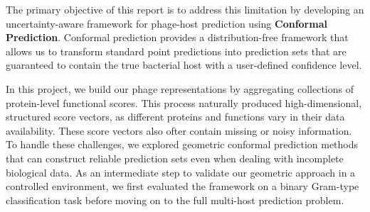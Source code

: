 The primary objective of this report is to address this limitation by developing an uncertainty-aware framework
for phage-host prediction using \textbf{Conformal Prediction}. Conformal prediction provides a
distribution-free framework that allows us to transform standard point predictions into prediction
sets that are guaranteed to contain the true bacterial host with a user-defined confidence level.

In this project, we build our phage representations by aggregating collections of protein-level functional scores. 
This process naturally produced high-dimensional, structured score vectors, as different proteins and functions vary 
in their data availability. These score vectors also ofter contain missing or noisy information. To handle these 
challenges, we explored geometric conformal prediction methods that can construct reliable prediction sets even when 
dealing with incomplete biological data. As an intermediate step to validate our geometric approach in a controlled 
environment, we first evaluated the framework on a binary Gram-type classification task before moving on to the full 
multi-host prediction problem.


